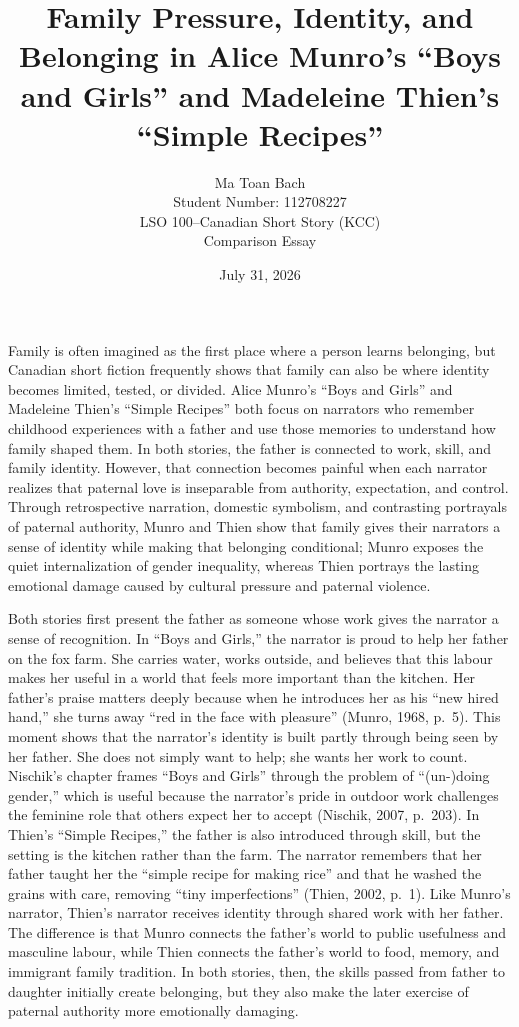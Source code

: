 \documentclass[12pt]{article}
\title{Family Pressure, Identity, and Belonging in Alice Munro's ``Boys and Girls'' and Madeleine Thien's ``Simple Recipes''}
\author{%
  Ma Toan Bach\\
  Student Number: 112708227\\
  LSO 100--Canadian Short Story (KCC)\\
  Comparison Essay
}
\date{July 31, 2026}
\begin{document}
\maketitle

Family is often imagined as the first place where a person learns belonging, but Canadian short fiction frequently shows that family can also be where identity becomes limited, tested, or divided. Alice Munro's ``Boys and Girls'' and Madeleine Thien's ``Simple Recipes'' both focus on narrators who remember childhood experiences with a father and use those memories to understand how family shaped them. In both stories, the father is connected to work, skill, and family identity. However, that connection becomes painful when each narrator realizes that paternal love is inseparable from authority, expectation, and control. Through retrospective narration, domestic symbolism, and contrasting portrayals of paternal authority, Munro and Thien show that family gives their narrators a sense of identity while making that belonging conditional; Munro exposes the quiet internalization of gender inequality, whereas Thien portrays the lasting emotional damage caused by cultural pressure and paternal violence.

Both stories first present the father as someone whose work gives the narrator a sense of recognition. In ``Boys and Girls,'' the narrator is proud to help her father on the fox farm. She carries water, works outside, and believes that this labour makes her useful in a world that feels more important than the kitchen. Her father's praise matters deeply because when he introduces her as his ``new hired hand,'' she turns away ``red in the face with pleasure'' (Munro, 1968, p.~5). This moment shows that the narrator's identity is built partly through being seen by her father. She does not simply want to help; she wants her work to count. Nischik's chapter frames ``Boys and Girls'' through the problem of ``(un-)doing gender,'' which is useful because the narrator's pride in outdoor work challenges the feminine role that others expect her to accept (Nischik, 2007, p.~203). In Thien's ``Simple Recipes,'' the father is also introduced through skill, but the setting is the kitchen rather than the farm. The narrator remembers that her father taught her the ``simple recipe for making rice'' and that he washed the grains with care, removing ``tiny imperfections'' (Thien, 2002, p.~1). Like Munro's narrator, Thien's narrator receives identity through shared work with her father. The difference is that Munro connects the father's world to public usefulness and masculine labour, while Thien connects the father's world to food, memory, and immigrant family tradition. In both stories, then, the skills passed from father to daughter initially create belonging, but they also make the later exercise of paternal authority more emotionally damaging.
\end{document}
